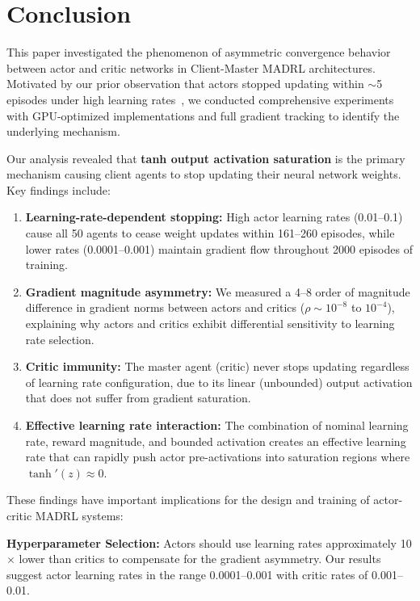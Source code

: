 \section{Conclusion}
\label{sec:conclusion}

This paper investigated the phenomenon of asymmetric convergence behavior between actor and critic networks in Client-Master MADRL architectures. Motivated by our prior observation that actors stopped updating within $\sim$5 episodes under high learning rates~\cite{gebrekidan2024thesis}, we conducted comprehensive experiments with GPU-optimized implementations and full gradient tracking to identify the underlying mechanism.

Our analysis revealed that \textbf{tanh output activation saturation} is the primary mechanism causing client agents to stop updating their neural network weights. Key findings include:

\begin{enumerate}
    \item \textbf{Learning-rate-dependent stopping:} High actor learning rates (0.01--0.1) cause all 50 agents to cease weight updates within 161--260 episodes, while lower rates (0.0001--0.001) maintain gradient flow throughout 2000 episodes of training.

    \item \textbf{Gradient magnitude asymmetry:} We measured a 4--8 order of magnitude difference in gradient norms between actors and critics ($\rho \sim 10^{-8}$ to $10^{-4}$), explaining why actors and critics exhibit differential sensitivity to learning rate selection.

    \item \textbf{Critic immunity:} The master agent (critic) never stops updating regardless of learning rate configuration, due to its linear (unbounded) output activation that does not suffer from gradient saturation.

    \item \textbf{Effective learning rate interaction:} The combination of nominal learning rate, reward magnitude, and bounded activation creates an effective learning rate that can rapidly push actor pre-activations into saturation regions where $\tanh'(z) \approx 0$.
\end{enumerate}

These findings have important implications for the design and training of actor-critic MADRL systems:

\textbf{Hyperparameter Selection:} Actors should use learning rates approximately 10$\times$ lower than critics to compensate for the gradient asymmetry. Our results suggest actor learning rates in the range 0.0001--0.001 with critic rates of 0.001--0.01.

